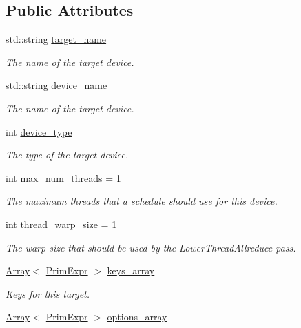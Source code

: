 \subsection*{Public Attributes}
\begin{DoxyCompactItemize}
\item 
std\+::string \hyperlink{classtvm_1_1TargetNode_aeafc514163bba21ce3c676edd07dd7cb}{target\+\_\+name}
\begin{DoxyCompactList}\small\item\em The name of the target device. \end{DoxyCompactList}\item 
std\+::string \hyperlink{classtvm_1_1TargetNode_a08da6caaa24e22a11859c12b941ff955}{device\+\_\+name}
\begin{DoxyCompactList}\small\item\em The name of the target device. \end{DoxyCompactList}\item 
int \hyperlink{classtvm_1_1TargetNode_ab18779083b5f3afadc7dbb080bc7ebcf}{device\+\_\+type}
\begin{DoxyCompactList}\small\item\em The type of the target device. \end{DoxyCompactList}\item 
int \hyperlink{classtvm_1_1TargetNode_ad501b3a5f9c4af3eac8ef71b924231c6}{max\+\_\+num\+\_\+threads} = 1
\begin{DoxyCompactList}\small\item\em The maximum threads that a schedule should use for this device. \end{DoxyCompactList}\item 
int \hyperlink{classtvm_1_1TargetNode_a4a6adb62a05cc26bd922998ab0b6dfce}{thread\+\_\+warp\+\_\+size} = 1
\begin{DoxyCompactList}\small\item\em The warp size that should be used by the Lower\+Thread\+Allreduce pass. \end{DoxyCompactList}\item 
\hyperlink{classtvm_1_1Array}{Array}$<$ \hyperlink{classtvm_1_1PrimExpr}{Prim\+Expr} $>$ \hyperlink{classtvm_1_1TargetNode_a172a4eb37b5bfae486439c06bc8182c8}{keys\+\_\+array}
\begin{DoxyCompactList}\small\item\em Keys for this target. \end{DoxyCompactList}\item 
\hyperlink{classtvm_1_1Array}{Array}$<$ \hyperlink{classtvm_1_1PrimExpr}{Prim\+Expr} $>$ \hyperlink{classtvm_1_1TargetNode_a6957dc3edcbf686c77d10dc4ce0be572}{options\+\_\+array}

\end{DoxyCompactItemize}

